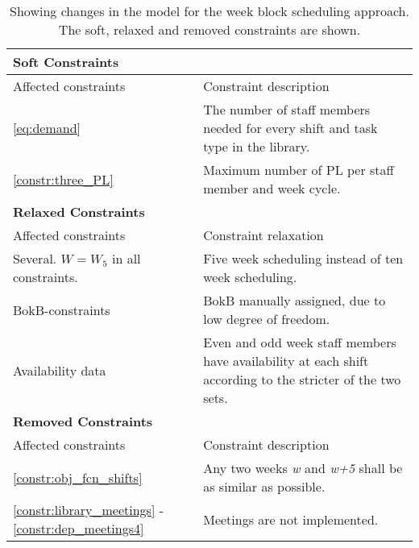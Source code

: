 \begin{table}[!h]
\centering
\caption{Showing changes in the model for the week block scheduling approach. The soft, relaxed and removed constraints are shown.}
\label{tab:weekly_task_constraints}
\begin{tabular}{|p{4cm}|p{7cm}|}
\hline
\multicolumn{2}{|l|}{\cellcolor{gray!90} \textbf{Soft Constraints}} \\
\hline 
\rowcolor{Gray} Affected constraints & Constraint description \\ \hline
\ref{eq:demand} & The number of staff members needed for every shift and task type in the library.  \\ \hline
\ref{constr:three_PL} & Maximum number of PL per staff member and week cycle. \\ \hline
\multicolumn{2}{|l|}{\cellcolor{gray!90} \textbf{Relaxed Constraints}} \\
\hline 
\rowcolor{Gray} Affected constraints & Constraint relaxation \\ \hline
Several. $W = W_5$ in all constraints. & Five week scheduling instead of ten week scheduling. \\ \hline
BokB-constraints & BokB manually assigned, due to low degree of freedom. \\ \hline
Availability data & Even and odd week staff members have availability at each shift according to the stricter of the two sets. \\ \hline
\multicolumn{2}{|l|}{\cellcolor{gray!90} \textbf{Removed Constraints}} \\
\hline 
\rowcolor{Gray} Affected constraints & Constraint description \\ \hline
\ref{constr:obj_fcn_shifts} & Any two weeks \textit{w} and \textit{w+5} shall be as similar as possible. \\ \hline
\ref{constr:library_meetings} - \ref{constr:dep_meetings4} & Meetings are not implemented. \\ \hline
\end{tabular}
\end{table}



